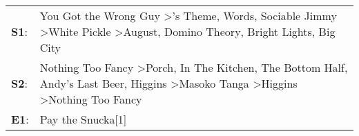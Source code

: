 \begin{supertabular}{p{0.03\textwidth}p{0.92\textwidth}}
 \textbf{S1}:  &                                                 You Got the Wrong Guy\textsuperscript{} \textgreater {}'s Theme\textsuperscript{}, \enspace Words\textsuperscript{}, \enspace Sociable Jimmy\textsuperscript{} \textgreater \enspace White Pickle\textsuperscript{} \textgreater \enspace August\textsuperscript{}, \enspace Domino Theory\textsuperscript{}, \enspace Bright Lights, Big City\textsuperscript{}  \enspace  \\
 \textbf{S2}:  &  Nothing Too Fancy\textsuperscript{} \textgreater \enspace Porch\textsuperscript{}, \enspace In The Kitchen\textsuperscript{}, \enspace The Bottom Half\textsuperscript{}, \enspace Andy's Last Beer\textsuperscript{}, \enspace Higgins\textsuperscript{} \textgreater \enspace Masoko Tanga\textsuperscript{} \textgreater \enspace Higgins\textsuperscript{} \textgreater \enspace Nothing Too Fancy\textsuperscript{}  \enspace  \\
 \textbf{E1}:  &                                                                                                                                                                                                                                                                                                                                                                                       Pay the Snucka[1]\textsuperscript{}  \enspace  \\
\end{supertabular}
